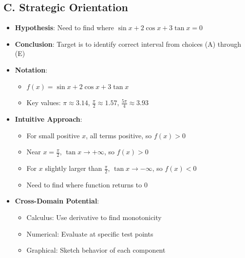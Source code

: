 \documentclass[]{article}
\begin{document}
\begin{problemconfigbox}
\subsection*{C. Strategic Orientation}
\begin{itemize}[leftmargin=*]
    \item \textbf{Hypothesis}: Need to find where $\sin{x} + 2\cos{x} + 3\tan{x} = 0$
    \item \textbf{Conclusion}: Target is to identify correct interval from choices (A) through (E)
    \item \textbf{Notation}: 
    \begin{itemize}
        \item $f(x) = \sin{x} + 2\cos{x} + 3\tan{x}$
        \item Key values: $\pi \approx 3.14$, $\frac{\pi}{2} \approx 1.57$, $\frac{5\pi}{4} \approx 3.93$
    \end{itemize}
    \item \textbf{Intuitive Approach}: 
    \begin{itemize}
        \item For small positive $x$, all terms positive, so $f(x) > 0$
        \item Near $x = \frac{\pi}{2}$, $\tan{x} \to +\infty$, so $f(x) > 0$
        \item For $x$ slightly larger than $\frac{\pi}{2}$, $\tan{x} \to -\infty$, so $f(x) < 0$
        \item Need to find where function returns to 0
    \end{itemize}
    \item \textbf{Cross-Domain Potential}: 
    \begin{itemize}
        \item Calculus: Use derivative to find monotonicity
        \item Numerical: Evaluate at specific test points
        \item Graphical: Sketch behavior of each component
    \end{itemize}
\end{itemize}
\end{problemconfigbox}
\end{document}
